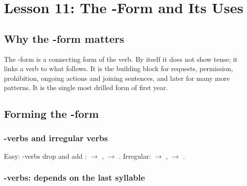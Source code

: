 \chapter{Lesson 11: The -Form and Its Uses}

\section{Why the -form matters}

The -form is a connecting form of the verb. By itself it does not show tense; it
links a verb to what follows. It is the building block for requests, permission,
prohibition, ongoing actions and joining sentences, and later for many more patterns.
It is the single most drilled form of first year.

\section{Forming the -form}

\subsection{-verbs and irregular verbs}
Easy: -verbs drop  and add :  $\to$ ,
 $\to$ . Irregular:  $\to$ ,  $\to$ .

\subsection{-verbs: depends on the last syllable}

